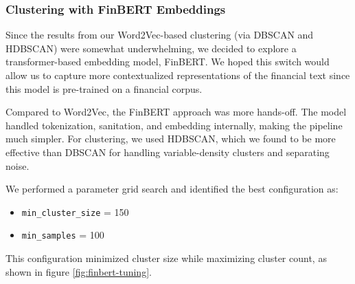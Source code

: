 \documentclass[twocolumn]{article}
\begin{document}
\subsubsection{Clustering with FinBERT Embeddings}


Since the results from our Word2Vec-based clustering (via DBSCAN and HDBSCAN) were somewhat underwhelming, we decided to explore a transformer-based embedding model, FinBERT. We hoped this switch would allow us to capture more contextualized representations of the financial text since this model is pre-trained on a financial corpus.

Compared to Word2Vec, the FinBERT approach was more hands-off. The model handled tokenization, sanitation, and embedding internally, making the pipeline much simpler. For clustering, we used HDBSCAN, which we found to be more effective than DBSCAN for handling variable-density clusters and separating noise.\cite{pratap2023dbscan}

We performed a parameter grid search and identified the best configuration as:
\begin{itemize}
    \item \texttt{min\_cluster\_size} = 150
    \item \texttt{min\_samples} = 100
\end{itemize}
This configuration minimized cluster size while maximizing cluster count, as shown in figure \ref{fig:finbert-tuning}.
\end{document}
